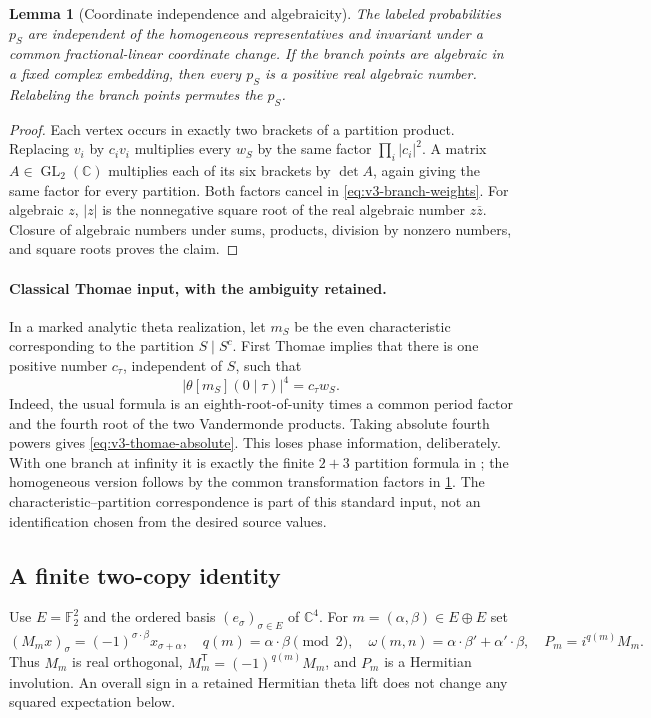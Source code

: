 \documentclass[11pt]{article}
\newtheorem{lemma}[lemma]{Lemma}
\theoremstyle{definition}
\theoremstyle{remark}
\newcommand{\C}{\mathbb C}
\newcommand{\F}{\mathbb F}
\begin{document}
\begin{lemma}[Coordinate independence and algebraicity]
\label{lem:v3-weight-intrinsic}
The labeled probabilities $p_S$ are independent of the homogeneous
representatives and invariant under a common fractional-linear coordinate
change. If the branch points are algebraic in a fixed complex embedding,
then every $p_S$ is a positive real algebraic number. Relabeling the branch
points permutes the $p_S$.
\end{lemma}
\begin{proof}
Each vertex occurs in exactly two brackets of a partition product. Replacing
$v_i$ by $c_i v_i$ multiplies every $w_S$ by the same factor
$\prod_i|c_i|^2$. A matrix $A\in\operatorname{GL}_2(\C)$ multiplies each
of its six brackets by $\det A$, again giving the same factor for every
partition. Both factors cancel in \eqref{eq:v3-branch-weights}.
For algebraic $z$, $|z|$ is the nonnegative square root of the real
algebraic number $z\overline z$. Closure of algebraic numbers under sums,
products, division by nonzero numbers, and square roots proves the claim.
\end{proof}

\paragraph{Classical Thomae input, with the ambiguity retained.}
In a marked analytic theta realization, let $m_S$ be the even
characteristic corresponding to the partition $S\mid S^c$. First Thomae
implies that there is one positive number $c_\tau$, independent of $S$,
such that
\begin{equation}
 \big|\theta[m_S](0\mid\tau)\big|^4=c_\tau w_S.
 \label{eq:v3-thomae-absolute}
\end{equation}
Indeed, the usual formula is an eighth-root-of-unity times a common period
factor and the fourth root of the two Vandermonde products. Taking absolute
fourth powers gives \eqref{eq:v3-thomae-absolute}. This loses phase
information, deliberately. With one branch at infinity it is exactly the
finite $2+3$ partition formula in \cite[\S2.6]{BernatskaThomae}; the
homogeneous version follows by the common transformation factors in
\cref{lem:v3-weight-intrinsic}. The characteristic--partition
correspondence is part of this standard input, not an identification chosen
from the desired source values.

\subsection{A finite two-copy identity}
Use $E=\F_2^2$ and the ordered basis $(e_\sigma)_{\sigma\in E}$ of
$\C^4$. For $m=(\alpha,\beta)\in E\oplus E$ set
\begin{equation}
 (M_mx)_\sigma=(-1)^{\sigma\cdot\beta}x_{\sigma+\alpha},
 \quad q(m)=\alpha\cdot\beta\pmod2,
 \quad \omega(m,n)=\alpha\cdot\beta'+\alpha'\cdot\beta,
 \quad P_m=i^{q(m)}M_m.
 \label{eq:v3-pauli}
\end{equation}
Thus $M_m$ is real orthogonal, $M_m^{\mathsf T}=(-1)^{q(m)}M_m$,
and $P_m$ is a Hermitian involution. An overall sign in a retained
Hermitian theta lift does not change any squared expectation below.
\end{document}

